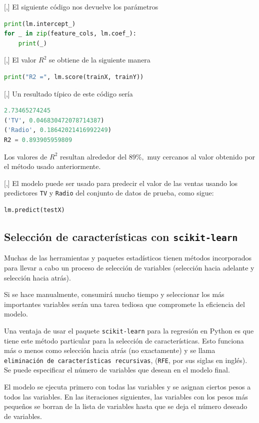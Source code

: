 [,]{}
El siguiente código nos devuelve los parámetros
\begin{lstlisting}[language=Python]
print(lm.intercept_)
for _ in zip(feature_cols, lm.coef_):
    print(_)
\end{lstlisting}

[,]{}
El valor $R^{2}$ se obtiene de la siguiente manera
\begin{lstlisting}[language=Python]
print("R2 =", lm.score(trainX, trainY))
\end{lstlisting}

[,]{}
Un resultado típico de este código sería
\begin{lstlisting}[language=Python]
2.73465274245
('TV', 0.046830472078714387)
('Radio', 0.18642021416992249)
R2 = 0.893905959809
\end{lstlisting}


Los valores de $R^{2}$ resultan alrededor del $89\%,$ muy cercanos al valor obtenido por el método usado anteriormente.

[,]{}
El modelo puede ser usado para predecir el valor de las ventas usando los predictores \texttt{TV} y \texttt{Radio} del conjunto de datos de prueba, como sigue:
\begin{lstlisting}[language=Python]
lm.predict(testX)
\end{lstlisting}


\subsection{Selección de características con \texttt{scikit-learn}}

Muchas de las herramientas y paquetes estadísticos tienen métodos incorporados para
llevar a cabo un proceso de selección de variables (selección hacia adelante y selección hacia atrás).


Si
se hace manualmente, consumirá mucho tiempo y seleccionar los más importantes  variables serán una tarea tediosa que compromete la eficiencia del modelo.


Una ventaja de usar el paquete \texttt{scikit-learn} para la regresión en Python es
que tiene este método particular para la selección de características. Esto funciona más o menos como
selección hacia atrás (no exactamente) y se llama \texttt{eliminación de características recursivas}, (\texttt{RFE}, por sus siglas en inglés).
Se puede especificar el número de variables que desean en el modelo final.


El modelo se ejecuta primero con todas las variables y se asignan ciertos pesos a todos
las variables. En las iteraciones siguientes, las variables con los pesos más pequeños
se borran de la lista de variables hasta que se deja el número deseado de variables.


